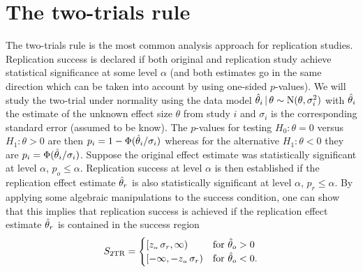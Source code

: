 \documentclass[a4paper, 11pt]{article}
\begin{document}
\section{The two-trials rule}
The two-trials rule is the most common analysis approach for replication
studies. Replication success is declared if both original and replication study
achieve statistical significance at some level $\alpha$ (and both estimates go
in the same direction which can be taken into account by using one-sided
$p$-values). We will study the two-trial under normality using the data model
$\hat{\theta}_{i} \,\vert\, \theta \sim \operatorname{N}(\theta, \sigma^{2}_{i})$ with $\hat{\theta}_{i}$ the
estimate of the unknown effect size $\theta$ from study $i$ and $\sigma_{i}$ is
the corresponding standard error (assumed to be know). The $p$-values for
testing $H_{0} \colon \theta = 0$ versus $H_{1} \colon \theta > 0$ are then
$p_{i} = 1 - \Phi(\hat{\theta}_{i}/\sigma_{i})$ whereas for the alternative
$H_{1} \colon \theta < 0$ they are $p_{i} = \Phi(\hat{\theta}_{i}/\sigma_{i})$. Suppose
the original effect estimate was statistically significant at level $\alpha$,
\ie{} $p_{o} \leq \alpha$. Replication success at level $\alpha$ is then
established if the replication effect estimate $\hat{\theta}_{r}$ is also statistically
significant at level $\alpha$, \ie{} $p_{r} \leq \alpha$. By applying some
algebraic manipulations to the success condition, one can show that this implies
that replication success is achieved if the replication effect estimate
$\hat{\theta}_{r}$ is contained in the success region
\begin{align*}
  S_{\text{2TR}} =
  \begin{cases}
    \left[z_{\scriptscriptstyle \alpha} \, \sigma_{r}, \infty \right) & \text{for} ~ \hat{\theta}_{o} > 0 \\
    \left[-\infty, -z_{\scriptscriptstyle \alpha} \, \sigma_{r} \right) & \text{for} ~ \hat{\theta}_{o} < 0.
  \end{cases}
\end{align*}
\end{document}

